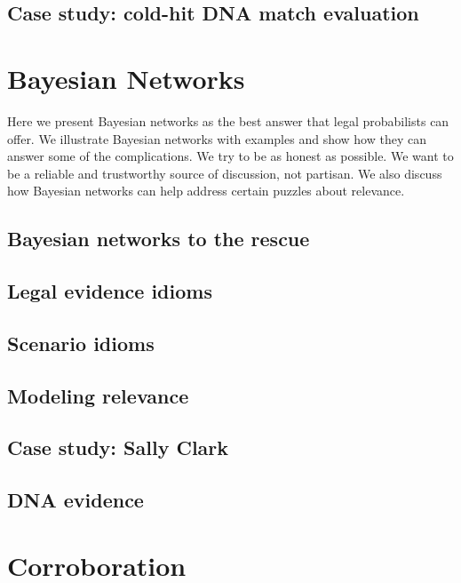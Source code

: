 \documentclass[]{book}
\begin{document}
\section{Case study: cold-hit DNA match evaluation}

\chapter{Bayesian Networks}

Here we present Bayesian networks as the best answer that legal
probabilists can offer. We illustrate Bayesian networks with examples
and show how they can answer some of the complications. We try to be as
honest as possible. We want to be a reliable and trustworthy source of
discussion, not partisan. We also discuss how Bayesian networks can help
address certain puzzles about relevance.

\section{Bayesian networks to the rescue}

\section{Legal evidence idioms}

\section{Scenario idioms}

\section{Modeling relevance}

\section{Case study: Sally Clark}


\section{DNA evidence}


\chapter{Corroboration}
\end{document}
